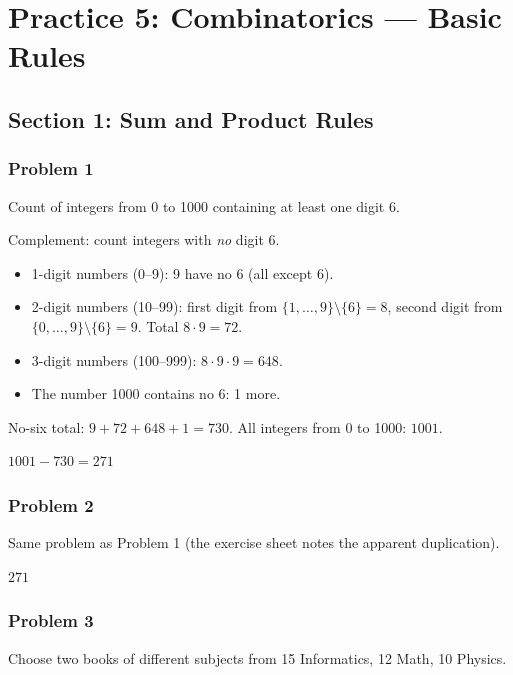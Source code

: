 
\section*{Practice 5: Combinatorics --- Basic Rules}

\subsection*{Section 1: Sum and Product Rules}

\subsubsection*{Problem 1}
Count of integers from 0 to 1000 containing at least one digit 6.

Complement: count integers with \emph{no} digit 6.
\begin{itemize}
  \item 1-digit numbers (0--9): 9 have no 6 (all except 6).
  \item 2-digit numbers (10--99): first digit from $\{1,\dots,9\}\setminus\{6\}=8$, second digit from $\{0,\dots,9\}\setminus\{6\}=9$. Total $8\cdot9=72$.
  \item 3-digit numbers (100--999): $8\cdot9\cdot9=648$.
  \item The number 1000 contains no 6: 1 more.
\end{itemize}
No-six total: $9+72+648+1=730$.
All integers from 0 to 1000: $1001$.

$\boxed{1001 - 730 = 271}$

\subsubsection*{Problem 2}
Same problem as Problem 1 (the exercise sheet notes the apparent duplication).

$\boxed{271}$

\subsubsection*{Problem 3}
Choose two books of different subjects from 15 Informatics, 12 Math, 10 Physics.

